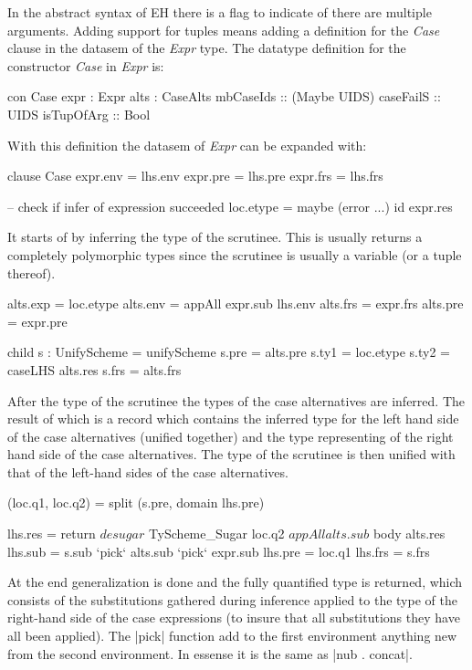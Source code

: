 In the abstract syntax of EH there is a flag to indicate of there are multiple arguments. Adding support for tuples means adding a definition for the \emph{Case} clause in the datasem of the \emph{Expr} type. The datatype definition for the constructor \emph{Case} in \emph{Expr} is:
\begin{code}
  con Case
    expr          :  Expr
    alts          :  CaseAlts
    mbCaseIds     :: (Maybe UIDS)
    caseFailS     :: UIDS
    isTupOfArg    :: Bool
\end{code}

With this definition the datasem of \emph{Expr} can be expanded with:

\begin{code}
   clause Case
      expr.env  = lhs.env
      expr.pre  = lhs.pre
      expr.frs  = lhs.frs
      
      -- check if infer of expression succeeded
      loc.etype = maybe (error ...) id expr.res
\end{code}
It starts of by inferring the type of the scrutinee. This is usually returns a completely polymorphic types since the scrutinee is usually a variable (or a tuple thereof). 

\begin{code}
   alts.exp  = loc.etype
   alts.env  = appAll expr.sub lhs.env
   alts.frs  = expr.frs
   alts.pre  = expr.pre
   
   child s : UnifyScheme = unifyScheme
   s.pre  = alts.pre
   s.ty1  = loc.etype
   s.ty2  = caseLHS alts.res
   s.frs  = alts.frs
\end{code}
After the type of the scrutinee the types of the case alternatives are inferred. The result of which is a record which contains the inferred type for the left hand side of the case alternatives (unified together) and the type representing of the right hand side of the case alternatives. The type of the scrutinee is then unified with that of the left-hand sides of the case alternatives.

\begin{code}       
   (loc.q1, loc.q2) = split (s.pre, domain lhs.pre)
   
   lhs.res = return  $ desugar 
                     $ TyScheme_Sugar loc.q2 
                     $ appAll alts.sub 
                     $ body alts.res
   lhs.sub  = s.sub `pick` alts.sub `pick` expr.sub
   lhs.pre  = loc.q1
   lhs.frs  = s.frs
\end{code}
At the end generalization is done and the fully quantified type is returned, which consists of the substitutions gathered during inference applied to the type of the right-hand side of the case expressions (to insure that all substitutions they have all been applied). The |pick| function add to the first environment anything new from the second environment. In essense it is the same as |nub . concat|.

